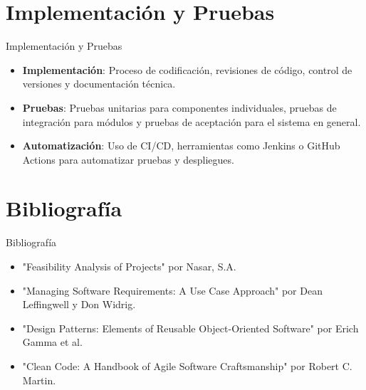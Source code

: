 \documentclass[aspectratio=169]{beamer}
\begin{document}
\section{Implementación y Pruebas}
\begin{frame}{Implementación y Pruebas}
    \begin{itemize}
        \item \textbf{Implementación}: Proceso de codificación, revisiones de código, control de versiones y documentación técnica.
        \item \textbf{Pruebas}: Pruebas unitarias para componentes individuales, pruebas de integración para módulos y pruebas de aceptación para el sistema en general.
        \item \textbf{Automatización}: Uso de CI/CD, herramientas como Jenkins o GitHub Actions para automatizar pruebas y despliegues.
    \end{itemize}
\end{frame}

\section{Bibliografía}
\begin{frame}{Bibliografía}
    \begin{itemize}
        \item "Feasibility Analysis of Projects" por Nasar, S.A.
        \item "Managing Software Requirements: A Use Case Approach" por Dean Leffingwell y Don Widrig.
        \item "Design Patterns: Elements of Reusable Object-Oriented Software" por Erich Gamma et al.
        \item "Clean Code: A Handbook of Agile Software Craftsmanship" por Robert C. Martin.
    \end{itemize}
\end{frame}
\end{document}
